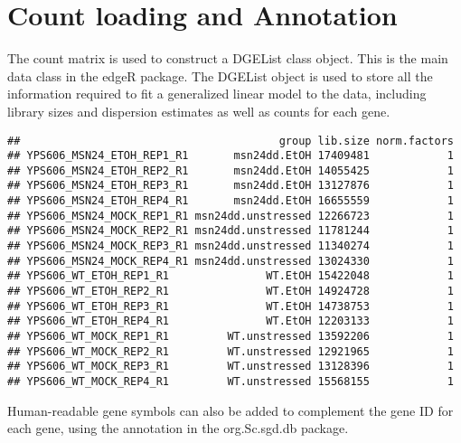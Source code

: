 \documentclass[
]{book}
\newenvironment{Shaded}{\begin{snugshade}}{\end{snugshade}}
\newcommand{\AttributeTok}[1]{\textcolor[rgb]{0.13,0.29,0.53}{#1}}
\newcommand{\FunctionTok}[1]{\textcolor[rgb]{0.13,0.29,0.53}{\textbf{#1}}}
\newcommand{\NormalTok}[1]{#1}
\newcommand{\OtherTok}[1]{\textcolor[rgb]{0.56,0.35,0.01}{#1}}
\newcommand{\SpecialCharTok}[1]{\textcolor[rgb]{0.81,0.36,0.00}{\textbf{#1}}}
\begin{document}
\hypertarget{count-loading-and-annotation-2}{%
\section{Count loading and Annotation}\label{count-loading-and-annotation-2}}

The count matrix is used to construct a DGEList class object. This is
the main data class in the edgeR package. The DGEList object is used to
store all the information required to fit a generalized linear model to
the data, including library sizes and dispersion estimates as well as
counts for each gene.

\begin{Shaded}
\end{Shaded}

\begin{verbatim}
##                                        group lib.size norm.factors
## YPS606_MSN24_ETOH_REP1_R1       msn24dd.EtOH 17409481            1
## YPS606_MSN24_ETOH_REP2_R1       msn24dd.EtOH 14055425            1
## YPS606_MSN24_ETOH_REP3_R1       msn24dd.EtOH 13127876            1
## YPS606_MSN24_ETOH_REP4_R1       msn24dd.EtOH 16655559            1
## YPS606_MSN24_MOCK_REP1_R1 msn24dd.unstressed 12266723            1
## YPS606_MSN24_MOCK_REP2_R1 msn24dd.unstressed 11781244            1
## YPS606_MSN24_MOCK_REP3_R1 msn24dd.unstressed 11340274            1
## YPS606_MSN24_MOCK_REP4_R1 msn24dd.unstressed 13024330            1
## YPS606_WT_ETOH_REP1_R1               WT.EtOH 15422048            1
## YPS606_WT_ETOH_REP2_R1               WT.EtOH 14924728            1
## YPS606_WT_ETOH_REP3_R1               WT.EtOH 14738753            1
## YPS606_WT_ETOH_REP4_R1               WT.EtOH 12203133            1
## YPS606_WT_MOCK_REP1_R1         WT.unstressed 13592206            1
## YPS606_WT_MOCK_REP2_R1         WT.unstressed 12921965            1
## YPS606_WT_MOCK_REP3_R1         WT.unstressed 13128396            1
## YPS606_WT_MOCK_REP4_R1         WT.unstressed 15568155            1
\end{verbatim}

Human-readable gene symbols can also be added to complement the gene ID
for each gene, using the annotation in the org.Sc.sgd.db package.
\end{document}
